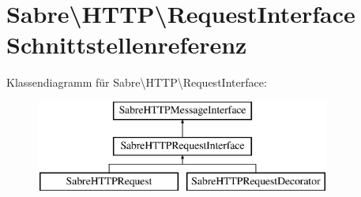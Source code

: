 \hypertarget{interface_sabre_1_1_h_t_t_p_1_1_request_interface}{}\section{Sabre\textbackslash{}H\+T\+TP\textbackslash{}Request\+Interface Schnittstellenreferenz}
\label{interface_sabre_1_1_h_t_t_p_1_1_request_interface}
Klassendiagramm für Sabre\textbackslash{}H\+T\+TP\textbackslash{}Request\+Interface\+:\begin{figure}[H]
\begin{center}
\leavevmode
\includegraphics[height=3.000000cm]{interface_sabre_1_1_h_t_t_p_1_1_request_interface}
\end{center}
\end{figure}

